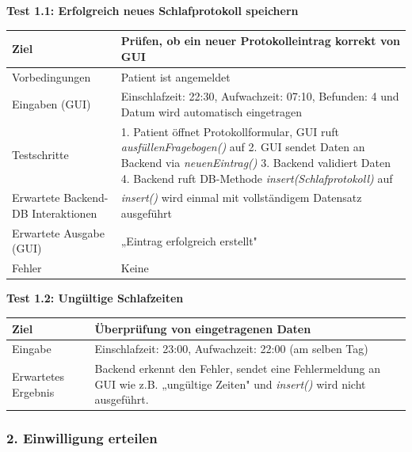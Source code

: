 \textbf{Test 1.1: Erfolgreich neues Schlafprotokoll speichern} \\
\begin{tabular}{|p{4cm}|p{10cm}|}
    \hline
    Ziel & Prüfen, ob ein neuer Protokolleintrag korrekt von GUI \\
    \hline
    Vorbedingungen & Patient ist angemeldet \\
    \hline
    Eingaben (GUI) & Einschlafzeit: 22:30, Aufwachzeit: 07:10, Befunden: 4 und Datum wird automatisch eingetragen \\
    \hline
    Testschritte & 
	1. Patient öffnet Protokollformular, GUI ruft \textit{ausfüllenFragebogen()} auf
	2. GUI sendet Daten an Backend via \textit{neuenEintrag()} 
	3. Backend validiert Daten 
	4. Backend ruft DB-Methode \textit{insert(Schlafprotokoll)} auf \\
    \hline
    Erwartete Backend-DB Interaktionen & \textit{insert()} wird einmal mit vollständigem Datensatz ausgeführt \\
    \hline
    Erwartete Ausgabe (GUI) & „Eintrag erfolgreich erstellt" \\
    \hline
    Fehler & Keine \\
    \hline
\end{tabular}

\vspace{0.5cm}

\textbf{Test 1.2: Ungültige Schlafzeiten} \\
\begin{tabular}{|p{4cm}|p{10cm}|}
    \hline
    Ziel & Überprüfung von eingetragenen Daten \\
    \hline
    Eingabe & Einschlafzeit: 23:00, Aufwachzeit: 22:00 (am selben Tag) \\
    \hline
    Erwartetes Ergebnis & Backend erkennt den Fehler, sendet eine Fehlermeldung an GUI wie z.B. „ungültige Zeiten" und \textit{insert()} wird nicht ausgeführt. \\
    \hline
\end{tabular}

\vspace{1cm}

\subsubsection*{2. Einwilligung erteilen}

